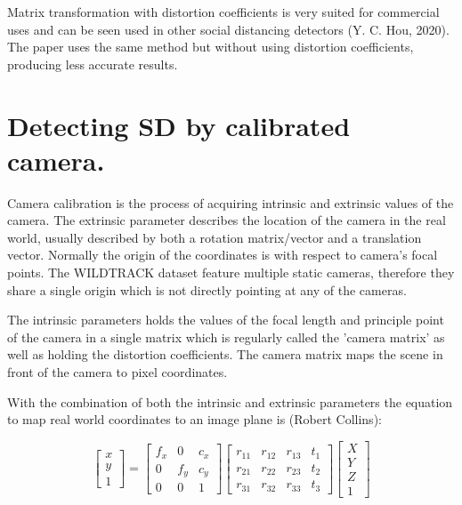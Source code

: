 \documentclass[12pt]{report}
\begin{document}
Matrix transformation with distortion coefficients is very suited for commercial uses and can be seen used in other social distancing detectors (Y. C. Hou, 2020). The paper uses the same method but without using distortion coefficients, producing less accurate results.

\section{Detecting SD by calibrated camera.}

Camera calibration is the process of acquiring intrinsic and extrinsic values of the camera. The extrinsic parameter describes the location of the camera in the real world, usually described by both a rotation matrix/vector and a translation vector. Normally the origin of the coordinates is with respect to camera's focal points. The WILDTRACK dataset feature multiple static cameras, therefore they share a single origin which is not directly pointing at any of the cameras.

\vspace{2mm}

The intrinsic parameters holds the values of the focal length and principle point of the camera in a single matrix which is regularly called the 'camera matrix' as well as holding the distortion coefficients. The camera matrix maps the scene in front of the camera to pixel coordinates.
\vspace{2mm}

With the combination of both the intrinsic and extrinsic parameters the equation to map real world coordinates to an image plane is (Robert Collins):

\begin{equation*}
\begin{bmatrix}
x \\
y \\
1
\end{bmatrix}
=
\begin{bmatrix}
f_{x} & 0 & c_{x} \\
0 & f_{y} & c_{y} \\
0 & 0 & 1
\end{bmatrix}
\begin{bmatrix}
r_{11} & r_{12} & r_{13} & t_{1}\\
r_{21} & r_{22} & r_{23} & t_{2}\\
r_{31} & r_{32} & r_{33} & t_{3}
\end{bmatrix}
\begin{bmatrix}
X \\
Y \\
Z \\
1
\end{bmatrix}
\end{equation*}
\end{document}
